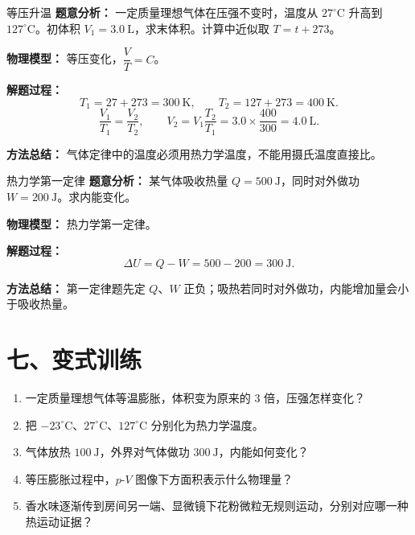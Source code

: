 \begin{examplebox}{等压升温}
\textbf{题意分析：} 一定质量理想气体在压强不变时，温度从 $27^\circ\mathrm{C}$ 升高到 $127^\circ\mathrm{C}$。初体积 $V_1=3.0\ \mathrm{L}$，求末体积。计算中近似取 $T=t+273$。

\textbf{物理模型：} 等压变化，$\dfrac{V}{T}=C$。

\begin{center}

\end{center}

\textbf{解题过程：}
\[
T_1=27+273=300\ \mathrm{K},\qquad T_2=127+273=400\ \mathrm{K}.
\]
\[
\frac{V_1}{T_1}=\frac{V_2}{T_2},
\qquad
V_2=V_1\frac{T_2}{T_1}=3.0\times\frac{400}{300}=4.0\ \mathrm{L}.
\]

\textbf{方法总结：} 气体定律中的温度必须用热力学温度，不能用摄氏温度直接比。
\end{examplebox}

\begin{examplebox}{热力学第一定律}
\textbf{题意分析：} 某气体吸收热量 $Q=500\ \mathrm{J}$，同时对外做功 $W=200\ \mathrm{J}$。求内能变化。

\textbf{物理模型：} 热力学第一定律。

\begin{center}

\end{center}

\textbf{解题过程：}
\[
\Delta U=Q-W=500-200=300\ \mathrm{J}.
\]

\textbf{方法总结：} 第一定律题先定 $Q$、$W$ 正负；吸热若同时对外做功，内能增加量会小于吸收热量。
\end{examplebox}

\section*{七、变式训练}

\begin{enumerate}
  \item 一定质量理想气体等温膨胀，体积变为原来的 3 倍，压强怎样变化？
  \item 把 $-23^\circ\mathrm{C}$、$27^\circ\mathrm{C}$、$127^\circ\mathrm{C}$ 分别化为热力学温度。
  \item 气体放热 $100\ \mathrm{J}$，外界对气体做功 $300\ \mathrm{J}$，内能如何变化？
  \item 等压膨胀过程中，$p$-$V$ 图像下方面积表示什么物理量？
  \begin{center}
  
  \end{center}
  \item 香水味逐渐传到房间另一端、显微镜下花粉微粒无规则运动，分别对应哪一种热运动证据？
\end{enumerate}

